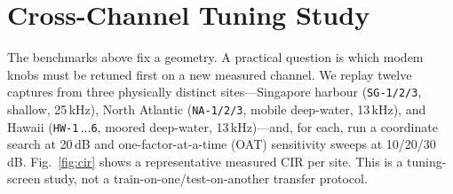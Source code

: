 \documentclass[journal]{IEEEtran}
\newcommand{\junalite}{JUNA-lite}
\newcommand{\junawz}{JUNA-Wz}
\begin{document}
\begin{table}[t]
\centering
\caption{\junawz{} versus \junalite{}: payload-exact PSR across SNR on the
three representative captures. \textbf{Bold} marks a gradient win with disjoint
Wilson 95\% intervals (generated from
\texttt{tex/figure\_data/tab\_grad\_vs\_lite.tex}).}
\label{tab:grad-vs-lite}
\small
\resizebox{\columnwidth}{!}{}
\end{table}

\begin{table}[t]
\centering
\caption{\junawz{} versus \junalite{}: stacked payload-exact PSR summary over all
48 capture--SNR cells in the head-to-head comparison (generated from
\texttt{tex/figure\_data/tab\_grad\_aggregate.tex}).}
\label{tab:grad-aggregate}
\small
\resizebox{\columnwidth}{!}{}
\end{table}

\begin{table}[t]
\centering
\caption{\junawz{} ablation against \junalite{}: payload-exact PSR for the default
soft \texttt{wz\_juna}, a hard-anchor variant, and a forced-final variant, each
against \junalite{}, on representative SG-1/NA-1/HW-1 captures at 5/10\,dB.
PSR follows the same payload-exact, post-selection definition as the main
tables; the final column gives the packet denominator.}
\label{tab:gradient-ablation}
\small
\resizebox{\columnwidth}{!}{}
\end{table}

\section{Cross-Channel Tuning Study}\label{sec:transfer}
The benchmarks above fix a geometry. A practical question is which modem knobs
must be retuned first on a new measured channel. We replay twelve captures from
three physically distinct sites---Singapore harbour
(\texttt{SG-1/2/3}, shallow, 25\,kHz), North Atlantic (\texttt{NA-1/2/3},
mobile deep-water, 13\,kHz), and Hawaii (\texttt{HW-1}\,$\dots$\texttt{6}, moored
deep-water, 13\,kHz)---and, for each, run a coordinate search at 20\,dB and
one-factor-at-a-time (OAT) sensitivity sweeps at 10/20/30\,dB. Fig.~\ref{fig:cir}
shows a representative measured CIR per site. This is a tuning-screen study, not
a train-on-one/test-on-another transfer protocol.
\end{document}
